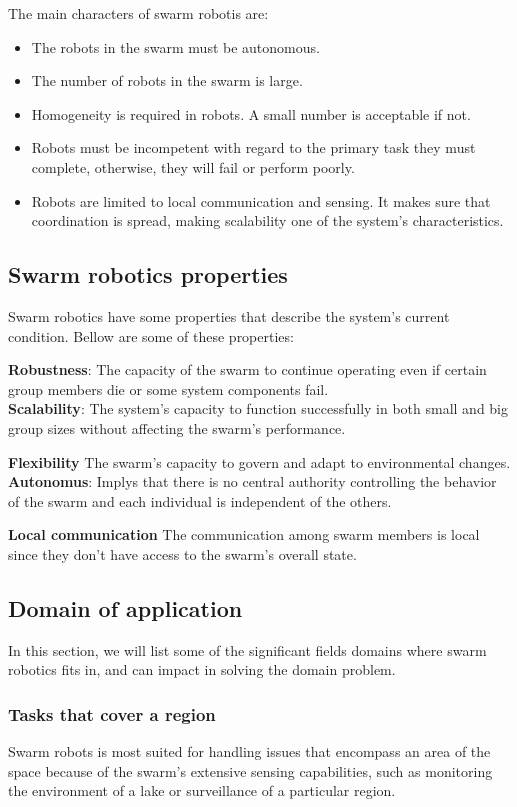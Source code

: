 \documentclass[12pt]{extarticle}
\begin{document}
The main characters of swarm robotis are:
\begin{itemize}
  \item  The robots in the swarm must be autonomous. 
  \item The number of robots in the swarm is large.
  \item Homogeneity is required in robots. A small number is acceptable if not.
  \item Robots must be incompetent  with regard to the primary task they must complete, otherwise, they will fail or perform poorly.
  \item Robots are limited to local communication and sensing. It makes sure that coordination is spread, making scalability one of the system's characteristics.\cite{navarro2013introduction}
\end{itemize}


\subsection{Swarm robotics properties}
Swarm robotics have some properties that describe the system's current condition. Bellow are some of these properties:

\textbf{Robustness}: The capacity of the swarm to continue operating even if certain group members die or some system components fail.\\
\textbf{Scalability}: The system's capacity to function successfully in both small and big group sizes without affecting the swarm's performance.

\textbf{Flexibility} The swarm's capacity to govern and adapt to environmental changes.
\textbf{Autonomus}: Implys that there is no central authority controlling the behavior of the swarm and each individual is independent of the others.

\textbf{Local communication} The communication among swarm members is local since they don't have access to  the swarm's overall state.
\cite{brambilla2013swarm}\cite{olaronke2020systematic} 

  

\subsection{Domain of application}
In this section, we will list some of the significant fields domains where swarm robotics fits in, and can impact in solving the domain problem.\newpage
\subsubsection{Tasks that cover a region}
Swarm robots is most suited for handling issues that encompass an area of the space because of the swarm's extensive sensing capabilities, such as monitoring the environment of a lake or surveillance of a particular region.\cite{csahin2005swarm}\cite{olaronke2020systematic}
\end{document}
